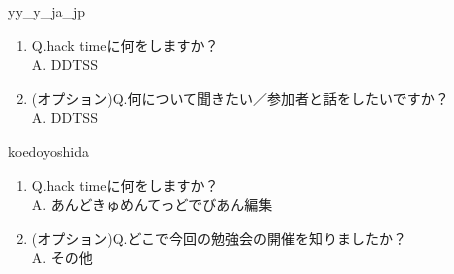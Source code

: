 \begin{prework}{yy\_y\_ja\_jp}
  \begin{enumerate}
  \item Q.hack timeに何をしますか？\\
    A. DDTSS
  \item (オプション)Q.何について聞きたい／参加者と話をしたいですか？\\
    A. DDTSS
  \end{enumerate}
\end{prework}

\begin{prework}{koedoyoshida}
  \begin{enumerate}
  \item Q.hack timeに何をしますか？\\
    A. あんどきゅめんてっどでびあん編集
  \item (オプション)Q.どこで今回の勉強会の開催を知りましたか？\\
    A. その他
  \end{enumerate}
\end{prework}

